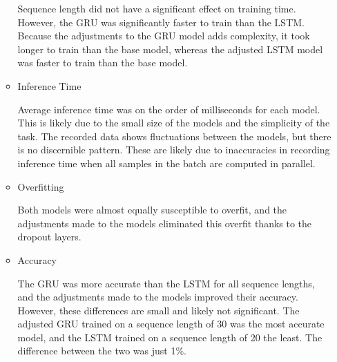 \documentclass{article}
\begin{document}
\begin{enumerate}[label=1\alph*. ]
\begin{itemize}
            Sequence length did not have a significant
            effect on training time. However, the GRU was
            significantly faster to train than the LSTM.
            Because the adjustments to the GRU model adds
            complexity, it took longer to train than the
            base model, whereas the adjusted LSTM model was
            faster to train than the base model.
            
        \item Inference Time
        
            Average inference time was on the order of
            milliseconds for each model. This is likely due
            to the small size of the models and the
            simplicity of the task. The recorded data shows
            fluctuations between the models, but there is no
            discernible pattern. These are likely due to
            inaccuracies in recording inference time when
            all samples in the batch are computed in
            parallel.

        \item Overfitting 
        
            Both models were almost equally
            susceptible to overfit, and the adjustments made
            to the models eliminated this overfit thanks to
            the dropout layers.
        
        \item Accuracy
        
            The GRU was more accurate than the LSTM for all
            sequence lengths, and the adjustments made to
            the models improved their accuracy. However,
            these differences are small and likely not
            significant. The adjusted GRU trained on a
            sequence length of 30 was the most accurate
            model, and the LSTM trained on a sequence length
            of 20 the least. The difference between the two
            was just 1\%.

    
    \end{itemize}

\end{enumerate}
\end{document}
